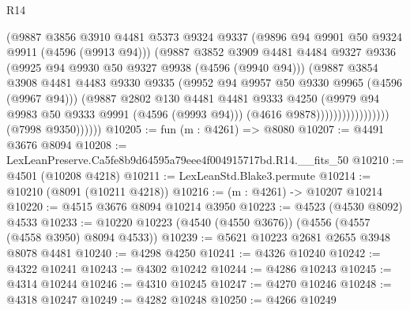 \begin{lexlean}{R14}
\begin{coremodule}
                                      (@9887
                                        @3856
                                        @3910
                                        @4481
                                        @5373
                                        @9324
                                        @9337
                                        (@9896 @94 @9901 @50 @9324 @9911 (@4596 (@9913 @94)))
                                        (@9887
                                          @3852
                                          @3909
                                          @4481
                                          @4484
                                          @9327
                                          @9336
                                          (@9925 @94 @9930 @50 @9327 @9938 (@4596 (@9940 @94)))
                                          (@9887
                                            @3854
                                            @3908
                                            @4481
                                            @4483
                                            @9330
                                            @9335
                                            (@9952 @94 @9957 @50 @9330 @9965 (@4596 (@9967 @94)))
                                            (@9887
                                              @2802
                                              @130
                                              @4481
                                              @4481
                                              @9333
                                              @4250
                                              (@9979 @94 @9983 @50 @9333 @9991 (@4596 (@9993 @94)))
                                              (@4616 @9878)))))))))))))))))
              (@7998 @9350))))))
@10205 := fun (m : @4261) => @8080
@10207 := @4491 @3676 @8094
@10208 := LexLeanPreserve.Ca5fe8b9d64595a79eee4f004915717bd.R14.__fits_50
@10210 := @4501 (@10208 @4218)
@10211 := LexLeanStd.Blake3.permute
@10214 := @10210 (@8091 (@10211 @4218))
@10216 := (m : @4261) -> @10207 @10214
@10220 := @4515 @3676 @8094 @10214 @3950
@10223 := @4523 (@4530 @8092) @4533
@10233 := @10220 @10223 (@4540 (@4550 @3676)) (@4556 (@4557 (@4558 @3950) @8094 @4533))
@10239 := @5621 @10223 @2681 @2655 @3948 @8078 @4481
@10240 := @4298 @4250
@10241 := @4326 @10240
@10242 := @4322 @10241
@10243 := @4302 @10242
@10244 := @4286 @10243
@10245 := @4314 @10244
@10246 := @4310 @10245
@10247 := @4270 @10246
@10248 := @4318 @10247
@10249 := @4282 @10248
@10250 := @4266 @10249

\end{coremodule}
\end{lexlean}
